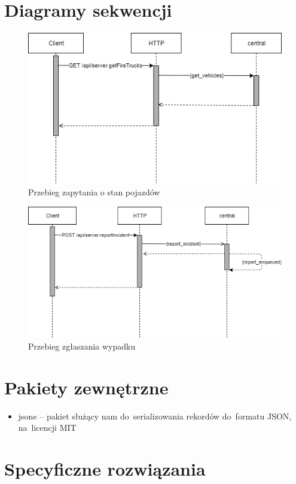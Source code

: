 \documentclass{article}
\begin{document}
\section{Diagramy sekwencji}
\begin{figure}[H]
	\includegraphics[width=.9\linewidth]{ChariotBase.png}
	\caption{Przebieg zapytania o stan pojazdów}
\end{figure}

\begin{figure}[H]
	\includegraphics[width=.9\linewidth]{ChariotCentral.png}
	\caption{Przebieg zgłaszania wypadku}
	
\end{figure}

\section{Pakiety zewnętrzne}
\begin{itemize}
	\item jsone -- pakiet służący nam do~serializowania rekordów do~formatu JSON, na~licencji MIT
\end{itemize}

\section{Specyficzne rozwiązania}
\end{document}
